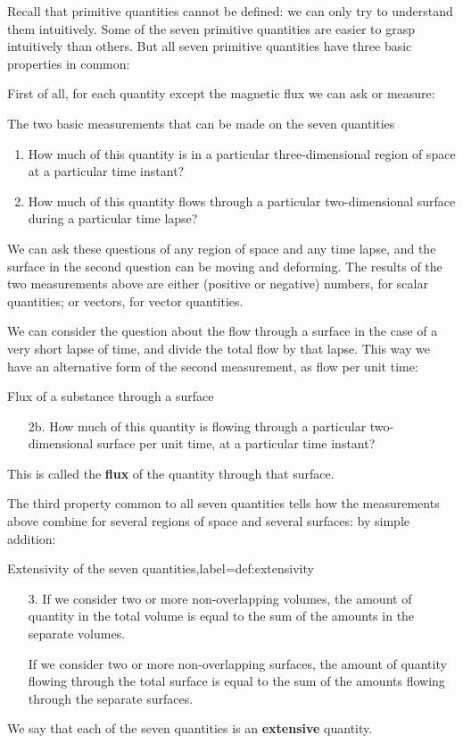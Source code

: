 \documentclass[a4paper,12pt,%
onecolumn,oneside,%
british%
]{memoir}
\renewcommand*{\|}[1][]{\nonscript\:#1\vert\nonscript\:\mathopen{}}
\begin{document}
\medskip

Recall that primitive quantities cannot be defined: we can only try to understand them intuitively. Some of the seven primitive quantities are easier to grasp intuitively than others. But all seven primitive quantities have three basic properties in common:

First of all, for each quantity except the magnetic flux we can ask or measure:
\begin{definition}{The two basic measurements that can be made on the seven quantities}
  \begin{enumerate}[shift,label=\arabic*.]\bfseries
  \item How much of this quantity is in a particular three-dimensional region of space at a particular time instant?

  \item How much of this quantity flows through a particular two-dimensional surface during a particular time lapse?
  \end{enumerate}
\end{definition}
We can ask these questions of any region of space and any time lapse, and the surface in the second question can be moving and deforming. The results of the two measurements above are either (positive or negative) numbers, for scalar quantities; or vectors, for vector quantities.

We can consider the question about the flow through a surface in the case of a very short lapse of time, and divide the total flow by that lapse. This way we have an alternative form of the second measurement, as flow per unit time:
\begin{definition}{Flux of a substance through a surface}
  \begin{enumerate}[shift,label=\arabic*.]\bfseries
  \item[2b.] How much of this quantity is flowing through a particular two-dimensional surface per unit time, at a particular time instant?
  \end{enumerate}
\end{definition}
This is called the \textbf{flux} of the quantity through that surface.

The third property common to all seven quantities tells how the measurements above combine for several regions of space and several surfaces: by simple addition:
\begin{definition}{Extensivity of the seven quantities,label={def:extensivity}}
\begin{enumerate}[shift,label=\arabic*.]\bfseries
  \item[3.]  If we consider two or more non-overlapping volumes, the amount of quantity in the total volume is equal to the sum of the amounts in the separate volumes.

    If we consider two or more non-overlapping surfaces, the amount of quantity flowing through the total surface is equal to the sum of the amounts flowing through the separate surfaces.
  \end{enumerate}
\end{definition}
We say that each of the seven quantities is an \textbf{extensive} quantity.
\end{document}
